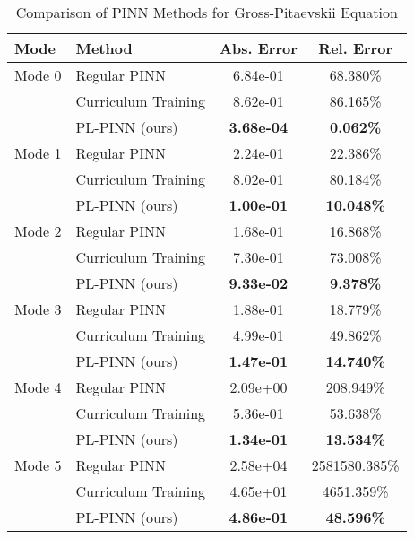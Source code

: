 \begin{table}[htbp]
\centering
\caption{Comparison of PINN Methods for Gross-Pitaevskii Equation}
\label{tab:pinn_comparison}
\begin{tabular}{llcc}
\toprule
Mode & Method & Abs. Error & Rel. Error \\
\midrule
Mode 0 & Regular PINN & 6.84e-01 & 68.380\% \\
 & Curriculum Training & 8.62e-01 & 86.165\% \\
 & PL-PINN (ours) & \textbf{3.68e-04} & \textbf{0.062\%} \\
\midrule
Mode 1 & Regular PINN & 2.24e-01 & 22.386\% \\
 & Curriculum Training & 8.02e-01 & 80.184\% \\
 & PL-PINN (ours) & \textbf{1.00e-01} & \textbf{10.048\%} \\
\midrule
Mode 2 & Regular PINN & 1.68e-01 & 16.868\% \\
 & Curriculum Training & 7.30e-01 & 73.008\% \\
 & PL-PINN (ours) & \textbf{9.33e-02} & \textbf{9.378\%} \\
\midrule
Mode 3 & Regular PINN & 1.88e-01 & 18.779\% \\
 & Curriculum Training & 4.99e-01 & 49.862\% \\
 & PL-PINN (ours) & \textbf{1.47e-01} & \textbf{14.740\%} \\
\midrule
Mode 4 & Regular PINN & 2.09e+00 & 208.949\% \\
 & Curriculum Training & 5.36e-01 & 53.638\% \\
 & PL-PINN (ours) & \textbf{1.34e-01} & \textbf{13.534\%} \\
\midrule
Mode 5 & Regular PINN & 2.58e+04 & 2581580.385\% \\
 & Curriculum Training & 4.65e+01 & 4651.359\% \\
 & PL-PINN (ours) & \textbf{4.86e-01} & \textbf{48.596\%} \\
\bottomrule
\end{tabular}
\end{table}
